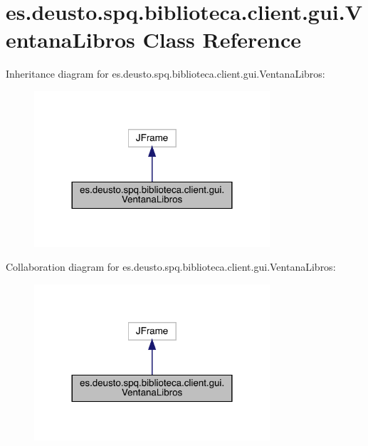 \hypertarget{classes_1_1deusto_1_1spq_1_1biblioteca_1_1client_1_1gui_1_1_ventana_libros}{}\section{es.\+deusto.\+spq.\+biblioteca.\+client.\+gui.\+Ventana\+Libros Class Reference}
\label{classes_1_1deusto_1_1spq_1_1biblioteca_1_1client_1_1gui_1_1_ventana_libros}


Inheritance diagram for es.\+deusto.\+spq.\+biblioteca.\+client.\+gui.\+Ventana\+Libros\+:
\nopagebreak
\begin{figure}[H]
\begin{center}
\leavevmode
\includegraphics[width=248pt]{classes_1_1deusto_1_1spq_1_1biblioteca_1_1client_1_1gui_1_1_ventana_libros__inherit__graph}
\end{center}
\end{figure}


Collaboration diagram for es.\+deusto.\+spq.\+biblioteca.\+client.\+gui.\+Ventana\+Libros\+:
\nopagebreak
\begin{figure}[H]
\begin{center}
\leavevmode
\includegraphics[width=248pt]{classes_1_1deusto_1_1spq_1_1biblioteca_1_1client_1_1gui_1_1_ventana_libros__coll__graph}
\end{center}
\end{figure}
